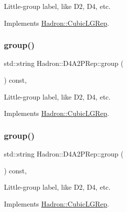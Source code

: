 Little-\/group label, like D2, D4, etc. 

Implements \mbox{\hyperlink{structHadron_1_1CubicLGRep_a9bdb14b519a611d21379ed96a3a9eb41}{Hadron\+::\+Cubic\+L\+G\+Rep}}.

\mbox{\label{structHadron_1_1D4A2PRep_aec02eb83b025cab9d6a38554361f3f90}} 
\subsubsection{\texorpdfstring{group()}{group()}\hspace{0.1cm}{\footnotesize\ttfamily [2/3]}}
{\footnotesize\ttfamily std\+::string Hadron\+::\+D4\+A2\+P\+Rep\+::group (\begin{DoxyParamCaption}{ }\end{DoxyParamCaption}) const\hspace{0.3cm}{\ttfamily [inline]}, {\ttfamily [virtual]}}

Little-\/group label, like D2, D4, etc. 

Implements \mbox{\hyperlink{structHadron_1_1CubicLGRep_a9bdb14b519a611d21379ed96a3a9eb41}{Hadron\+::\+Cubic\+L\+G\+Rep}}.

\mbox{\label{structHadron_1_1D4A2PRep_aec02eb83b025cab9d6a38554361f3f90}} 
\subsubsection{\texorpdfstring{group()}{group()}\hspace{0.1cm}{\footnotesize\ttfamily [3/3]}}
{\footnotesize\ttfamily std\+::string Hadron\+::\+D4\+A2\+P\+Rep\+::group (\begin{DoxyParamCaption}{ }\end{DoxyParamCaption}) const\hspace{0.3cm}{\ttfamily [inline]}, {\ttfamily [virtual]}}

Little-\/group label, like D2, D4, etc. 

Implements \mbox{\hyperlink{structHadron_1_1CubicLGRep_a9bdb14b519a611d21379ed96a3a9eb41}{Hadron\+::\+Cubic\+L\+G\+Rep}}.

\mbox{\label{structHadron_1_1D4A2PRep_a0d17ee51770f635eb312b9da22dd1c1f}} 

